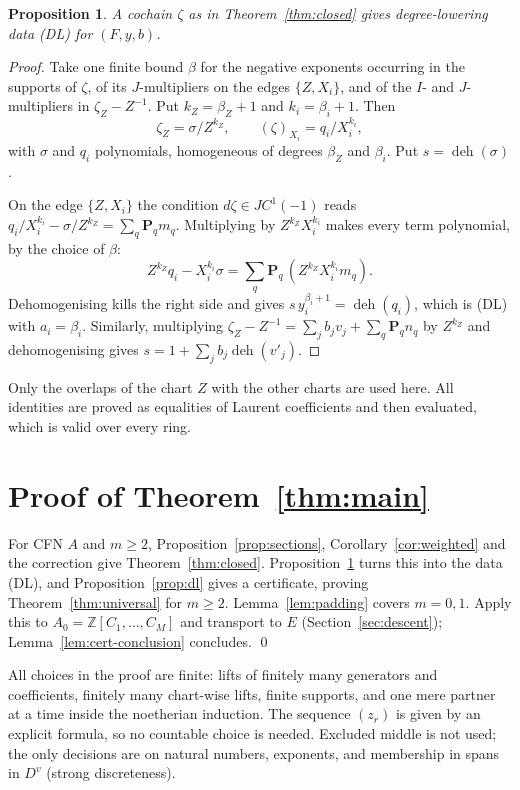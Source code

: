 \documentclass[11pt]{amsart}
\numberwithin{equation}{section}
\newtheorem{proposition}[theorem]{Proposition}
\theoremstyle{definition}
\theoremstyle{remark}
\DeclareMathOperator{\deh}{deh}
\newcommand{\ZZ}{\mathbb Z}
\begin{document}
\begin{proposition}\label{prop:extraction}
A cochain $\zeta$ as in Theorem~\ref{thm:closed} gives degree-lowering
data (DL) for $(F,y,b)$.
\end{proposition}
\begin{proof}
Take one finite bound $\beta$ for the negative exponents occurring in
the supports of $\zeta$, of its $J$-multipliers on the edges
$\{Z,X_i\}$, and of the $I$- and $J$-multipliers in
$\zeta_Z-Z^{-1}$. Put $k_Z=\beta_Z+1$ and $k_i=\beta_i+1$. Then
\[
 \zeta_Z=\sigma/Z^{k_Z},\qquad (\zeta)_{X_i}=q_i/X_i^{k_i},
\]
with $\sigma$ and $q_i$ polynomials, homogeneous of degrees $\beta_Z$
and $\beta_i$. Put $s=\deh(\sigma)$.

On the edge $\{Z,X_i\}$ the condition $d\zeta\in JC^1(-1)$ reads
$q_i/X_i^{k_i}-\sigma/Z^{k_Z}=\sum_q\mathbf P_qm_q$. Multiplying by
$Z^{k_Z}X_i^{k_i}$ makes every term polynomial, by the choice of
$\beta$:
\[
 Z^{k_Z}q_i-X_i^{k_i}\sigma=\sum_q\mathbf P_q\,(Z^{k_Z}X_i^{k_i}m_q).
\]
Dehomogenising kills the right side and gives
$s\,y_i^{\beta_i+1}=\deh(q_i)$, which is (DL) with $a_i=\beta_i$.
Similarly, multiplying $\zeta_Z-Z^{-1}=\sum_jb_jv_j+\sum_q\mathbf P_qn_q$
by $Z^{k_Z}$ and dehomogenising gives $s=1+\sum_jb_j\deh(v'_j)$.
\end{proof}

Only the overlaps of the chart $Z$ with the other charts are used here.
All identities are proved as equalities of Laurent coefficients and
then evaluated, which is valid over every ring.

\section{Proof of Theorem~\ref{thm:main}}
For CFN $A$ and $m\ge2$, Proposition~\ref{prop:sections},
Corollary~\ref{cor:weighted} and the correction give
Theorem~\ref{thm:closed}. Proposition~\ref{prop:extraction} turns this
into the data (DL), and Proposition~\ref{prop:dl} gives a certificate,
proving Theorem~\ref{thm:universal} for $m\ge2$. Lemma~\ref{lem:padding}
covers $m=0,1$. Apply this to $A_0=\ZZ[C_1,\ldots,C_M]$ and transport to
$E$ (Section~\ref{sec:descent}); Lemma~\ref{lem:cert-conclusion}
concludes. \qed

\medskip
All choices in the proof are finite: lifts of finitely many
generators and coefficients, finitely many chart-wise lifts, finite
supports, and one mere partner at a time inside the noetherian
induction. The sequence $(z_r)$ is given by an explicit formula, so no
countable choice is needed. Excluded middle is not used; the only
decisions are on natural numbers, exponents, and membership in spans
in $D^v$ (strong discreteness).
\end{document}
